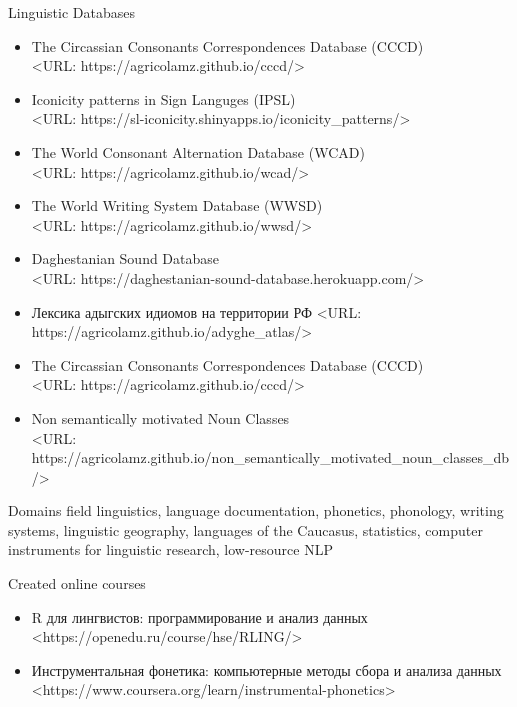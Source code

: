 \documentclass{resume} %
\begin{document}
\begin{rSection}{Linguistic Databases}
\begin{itemize}
\item The Circassian Consonants Correspondences Database (CCCD) \\ <URL: https://agricolamz.github.io/cccd/>
\item Iconicity patterns in Sign Languges (IPSL) \\ <URL: https://sl-iconicity.shinyapps.io/iconicity\_patterns/>
\item The World Consonant Alternation Database (WCAD) \\ <URL: https://agricolamz.github.io/wcad/>
\item The World Writing System Database (WWSD) \\ <URL: https://agricolamz.github.io/wwsd/>
\item Daghestanian Sound Database \\ <URL: https://daghestanian-sound-database.herokuapp.com/>
\item Лексика адыгских идиомов на территории РФ <URL: https://agricolamz.github.io/adyghe\_atlas/>
\item The Circassian Consonants Correspondences Database (CCCD) \\ <URL: https://agricolamz.github.io/cccd/>
\item Non semantically motivated Noun Classes \\ <URL: https://agricolamz.github.io/non\_semantically\_motivated\_noun\_classes\_db/> \vspace{0.6cm}
\end{itemize}
\end{rSection}

\begin{rSection}{Domains}
field linguistics, language documentation, phonetics, phonology, writing systems, linguistic geography, languages of the Caucasus, statistics, computer instruments for linguistic research, low-resource NLP
\end{rSection}

\begin{rSection}{Created online courses}
\begin{itemize}
\item R для лингвистов: программирование и анализ данных\\
<https://openedu.ru/course/hse/RLING/>
\item Инструментальная фонетика: компьютерные методы сбора и анализа данных\\
<https://www.coursera.org/learn/instrumental-phonetics>
\end{itemize}

\end{rSection}
\end{document}
